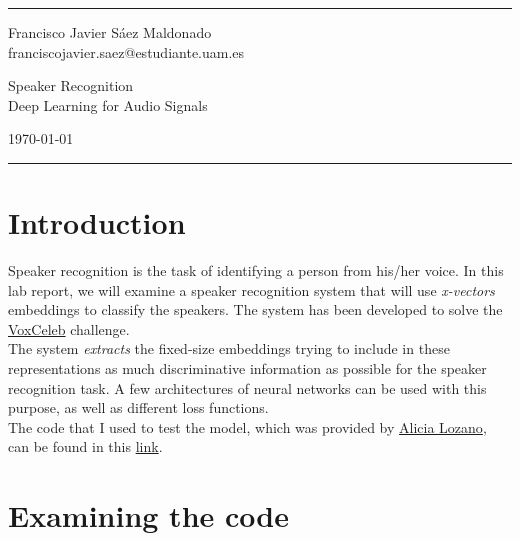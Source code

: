 \documentclass[a4paper]{article}
\begin{document}

\fancyhead[C]{}
\hrule \medskip %
\begin{minipage}{0.295\textwidth}
  \raggedright
  \footnotesize
  Francisco Javier Sáez Maldonado \hfill\\
  franciscojavier.saez@estudiante.uam.es
  \hfill\\
\end{minipage}
\begin{minipage}{0.4\textwidth}
  \centering
  \large
  Speaker Recognition\\
  \normalsize
  Deep Learning for Audio Signals\\
\end{minipage}
\begin{minipage}{0.295\textwidth}
  \raggedleft
  \today\hfill\\
\end{minipage}
\medskip\hrule


\tableofcontents

\section*{Introduction}

Speaker recognition is the task of identifying a person from his/her voice. In this lab report, we will examine a speaker recognition system that will use \emph{x-vectors} embeddings to classify the speakers. The system has been developed to solve the \href{https://www.robots.ox.ac.uk/~vgg/data/voxceleb/competition2020.html}{VoxCeleb} challenge.\\

The system \emph{extracts} the fixed-size embeddings trying to include in these representations as much discriminative information as possible for the speaker recognition task. A few architectures of neural networks can be used with this purpose, as well as different loss functions.\\

The code that I used to test the model, which was provided by \href{http://audias.ii.uam.es/staff/}{Alicia Lozano}, can be found in this \href{https://drive.google.com/file/d/1aWhFcbRUTJ0sOtYNPvLjHencfINu8SFz/view?usp=sharing}{link}.

\section{Examining the code}
\end{document}
